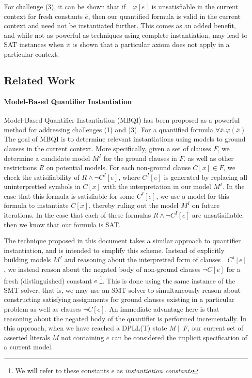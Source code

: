 \documentclass{llncs}
\begin{document}
For challenge (3), it can be shown that if $\neg \varphi[e]$ is unsatisfiable in the current context for fresh constants $\bar{e}$, then our quantified formula is valid in the current context and need not be instantiated further.
This comes as an added benefit, and while not as powerful as techniques using complete instantiation, may lead to SAT instances when it is shown that a particular axiom does not apply in a particular context.

\subsection{Related Work}

\paragraph{Model-Based Quantifier Instantiation}
Model-Based Quantifier Instantiation (MBQI) has been proposed as a powerful method for addressing challenges (1) and (3).
For a quantified formula $\forall \bar{x}. \varphi(\bar{x})$
The goal of MBQI is to determine relevant instantiations using models to ground clauses in the current context.
More specifically, given a set of clauses $F$, we determine a candidate model $M^I$ for the ground clauses in $F$, as well as other restrictions $R$ on potential models.
For each non-ground clause $C[x] \in F$, we check the satisifiability of $R \wedge \neg C^I[e]$, where $C^I[e]$ is generated by replacing all uninterpretted symbols in $C[x]$ with the interpretation in our model $M^I$.
In the case that this formula is satisfiable for some $C^I[e]$, we use a model for this formula to instantiate $C[x]$, thereby ruling out the model $M^I$ on future iterations.
In the case that each of these formulas $R \wedge \neg C^I[e]$ are unsatisifiable, then we know that our formula is SAT.


The technique proposed in this document takes a similar approach to quantifier instantiation, and is intended to simplify this scheme.
Instead of explicitly building models $M^I$ and reasoning about the interpretted form of clauses $\neg C^I[e]$, we instead reason  about the negated body of non-ground clauses $\neg C[e]$ for a fresh (distinguished) constant $e$ \footnote{ We will refer to these constants $\bar{e}$ as \emph{instantiation constants} }.
This is done using the same instance of the SMT solver, that is, we may use an SMT solver to simultaneously reason about constructing satisfying assignments for ground clauses existing in a particular problem as well as clauses $\neg C[e]$.
An immediate advantage here is that reasoning about the negated body of the quantifier is performed incrementally.
In this approach, when we have reached a DPLL(T) state $M \parallel F$, our current set of asserted literals $M$ not containing $\bar{e}$ can be considered the implicit specification of a current model.
\end{document}
